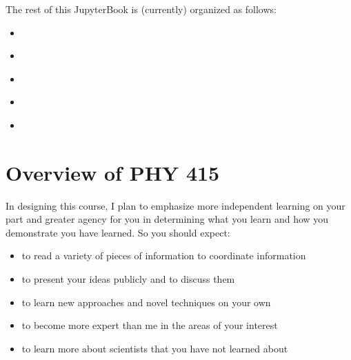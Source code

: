 \documentclass[letterpaper,10pt,english]{jupyterBook}
\begin{document}
\sphinxAtStartPar
The rest of this JupyterBook is (currently) organized as follows:
\begin{itemize}
\item {} 
\sphinxAtStartPar
{\hyperref[\detokenize{content/0_course/syllabus::doc}]{}}

\item {} 
\sphinxAtStartPar
{\hyperref[\detokenize{content/0_course/reading_questions::doc}]{}}

\item {} 
\sphinxAtStartPar
{\hyperref[\detokenize{content/1_modeling/what_is_modeling::doc}]{}}

\item {} 
\sphinxAtStartPar
{\hyperref[\detokenize{content/2_oscillations/readings-oscillators::doc}]{}}

\item {} 
\sphinxAtStartPar
{\hyperref[\detokenize{content/X_additional_pages/references-page::doc}]{}}

\end{itemize}

\sphinxstepscope


\chapter{Overview of PHY 415}
\label{\detokenize{content/0_course/syllabus:overview-of-phy-415}}\label{\detokenize{content/0_course/syllabus::doc}}
\sphinxAtStartPar
In designing this course, I plan to emphasize more independent learning on your part and greater agency for you in determining what you learn and how you demonstrate you have learned. So you should expect:
\begin{itemize}
\item {} 
\sphinxAtStartPar
to read a variety of pieces of information to coordinate information

\item {} 
\sphinxAtStartPar
to present your ideas publicly and to discuss them

\item {} 
\sphinxAtStartPar
to learn new approaches and novel techniques on your own

\item {} 
\sphinxAtStartPar
to become more expert than me in the areas of your interest

\item {} 
\sphinxAtStartPar
to learn more about scientists that you have not learned about

\end{itemize}
\end{document}

